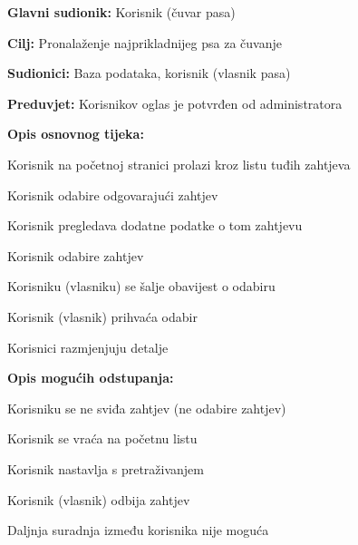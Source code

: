 					\noindent {}
					\begin{packed_item}
						
						\item \textbf{Glavni sudionik: } Korisnik (čuvar pasa)
						\item  \textbf{Cilj:} Pronalaženje najprikladnijeg psa za čuvanje
						\item  \textbf{Sudionici:} Baza podataka, korisnik (vlasnik pasa)
						\item  \textbf{Preduvjet:} Korisnikov oglas je potvrđen od administratora
						\item  \textbf{Opis osnovnog tijeka:}
						
						\item[] \begin{packed_enum}
							
							\item Korisnik na početnoj stranici prolazi kroz listu tuđih zahtjeva   
							\item Korisnik odabire odgovarajući zahtjev
							\item Korisnik pregledava dodatne podatke o tom zahtjevu
							\item Korisnik odabire zahtjev 
							\item Korisniku (vlasniku) se šalje obavijest o odabiru
							\item Korisnik (vlasnik) prihvaća odabir
							\item Korisnici razmjenjuju detalje
							
						\end{packed_enum}
						
						\item  \textbf{Opis mogućih odstupanja:}
						
						\item[] \begin{packed_item}
							
							\item[4.a] Korisniku se ne sviđa zahtjev (ne odabire zahtjev)
							\item[] \begin{packed_enum}
								
								\item Korisnik se vraća na početnu listu
								\item Korisnik nastavlja s pretraživanjem
								
							\end{packed_enum}
							
							\item[6.a] Korisnik (vlasnik) odbija zahtjev 
							\item[] \begin{packed_enum}
								
								\item Daljnja suradnja između korisnika nije moguća
								
							\end{packed_enum}
						\end{packed_item}
					\end{packed_item}	
					
